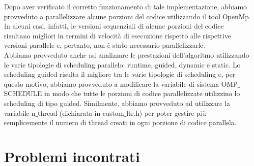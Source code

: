 Dopo aver verificato il corretto funzionamento di tale implementazione, abbiamo provveduto a parallelizzare alcune porzioni del codice utilizzando il tool OpenMp. In alcuni casi, infatti, le versioni sequenziali di alcune porzioni del codice risultano migliori in termini di velocità di esecuzione rispetto alle rispettive versioni parallele e, pertanto, non è stato necessario parallelizzarle.\\ Abbiamo provveduto anche ad analizzare le prestazioni dell'algoritmo utilizzando le varie tipologie di scheduling parallelo: runtime, guided, dynamic e static. Lo scheduling guided risulta il migliore tra le varie tipologie di scheduling e, per questo motivo, abbiamo provveduto a modificare la variabile di sistema OMP$\_$SCHEDULE in modo che tutte le porzioni di codice parallelizzate utilizzino lo scheduling di tipo guided. Similmente, abbiamo provveduto ad utilizzare la variabile n$\_$thread (dichiarata in custom$\_$ltr.h) per poter gestire più semplicemente il numero di thread creati in ogni porzione di codice parallela.

	\section*{Problemi incontrati}

